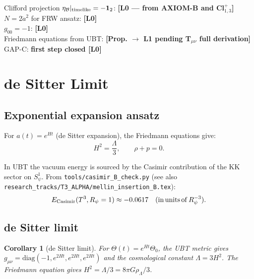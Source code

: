 \documentclass[12pt,a4paper]{article}
\newtheorem{corollary}[theorem]{Corollary}
\begin{document}
\begin{openproblembox}
\begin{statusbox}
Clifford projection $\eta_{\mathcal{B}}|_{\rm timelike}=-\mathbf{1}_2$:
  \textbf{[L0 — from AXIOM-B and Cl}$^+_{1,3}$\textbf{]}\\
$N = 2\dot a^2$ for FRW ansatz: \textbf{[L0]}\\
$g_{00} = -1$: \textbf{[L0]}\\
Friedmann equations from UBT: \textbf{[Prop. $\to$ L1 pending T$_{\mu\nu}$ full derivation]}\\
GAP-C: \textbf{first step closed [L0]}
\end{statusbox}

\end{openproblembox}

\section{de Sitter Limit}
\label{sec:de_sitter}

\subsection{Exponential expansion ansatz}

For $a(t) = e^{Ht}$ (de Sitter expansion), the Friedmann equations give:
\[
  H^2 = \frac{\Lambda}{3}, \qquad \rho + p = 0.
\]

In UBT the vacuum energy is sourced by the Casimir contribution of the
KK sector on $S^1_\psi$.  From \texttt{tools/casimir\_B\_check.py}
(see also \texttt{research\_tracks/T3\_ALPHA/mellin\_insertion\_B.tex}):
\[
  E_{\rm Casimir}(T^3, R_\psi = 1) \approx -0.0617\quad (\mathrm{in\,units\,of}\,R_\psi^{-3}).
\]

\subsection{de Sitter limit}
\label{sec:desitter}

\begin{corollary}[de Sitter limit]
\label{cor:desitter}
For $\Theta(t) = e^{Ht}\Theta_0$, the UBT metric gives
$g_{\mu\nu} = \mathrm{diag}(-1, e^{2Ht}, e^{2Ht}, e^{2Ht})$
and the cosmological constant $\Lambda = 3H^2$.
The Friedmann equation gives $H^2 = \Lambda/3 = 8\pi G\rho_\Lambda/3$.
\end{corollary}
\end{document}
